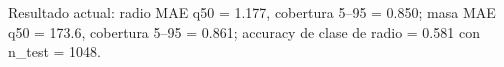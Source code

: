 Resultado actual: radio MAE q50 = 1.177, cobertura 5--95 = 0.850; masa MAE q50 = 173.6, cobertura 5--95 = 0.861; accuracy de clase de radio = 0.581 con n\_test = 1048.
